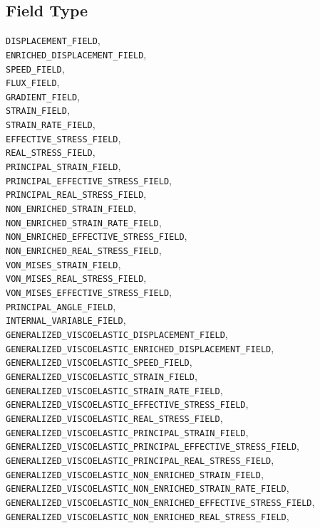 \documentclass[10pt]{article}
\begin{document}
\subsection{Field Type}

    \verb+DISPLACEMENT_FIELD+,\\
    \verb+ENRICHED_DISPLACEMENT_FIELD+,\\
    \verb+SPEED_FIELD+,\\
    \verb+FLUX_FIELD+,\\
    \verb+GRADIENT_FIELD+,\\
    \verb+STRAIN_FIELD+,\\
    \verb+STRAIN_RATE_FIELD+,\\
    \verb+EFFECTIVE_STRESS_FIELD+,\\
    \verb+REAL_STRESS_FIELD+,\\
    \verb+PRINCIPAL_STRAIN_FIELD+,\\
    \verb+PRINCIPAL_EFFECTIVE_STRESS_FIELD+,\\
    \verb+PRINCIPAL_REAL_STRESS_FIELD+,\\
    \verb+NON_ENRICHED_STRAIN_FIELD+,\\
    \verb+NON_ENRICHED_STRAIN_RATE_FIELD+,\\
    \verb+NON_ENRICHED_EFFECTIVE_STRESS_FIELD+,\\
    \verb+NON_ENRICHED_REAL_STRESS_FIELD+,\\
    \verb+VON_MISES_STRAIN_FIELD+,\\
    \verb+VON_MISES_REAL_STRESS_FIELD+,\\
    \verb+VON_MISES_EFFECTIVE_STRESS_FIELD+,\\
    \verb+PRINCIPAL_ANGLE_FIELD+,\\
    \verb+INTERNAL_VARIABLE_FIELD+,\\
    \verb+GENERALIZED_VISCOELASTIC_DISPLACEMENT_FIELD+,\\
    \verb+GENERALIZED_VISCOELASTIC_ENRICHED_DISPLACEMENT_FIELD+,\\
    \verb+GENERALIZED_VISCOELASTIC_SPEED_FIELD+,\\
    \verb+GENERALIZED_VISCOELASTIC_STRAIN_FIELD+,\\
    \verb+GENERALIZED_VISCOELASTIC_STRAIN_RATE_FIELD+,\\
    \verb+GENERALIZED_VISCOELASTIC_EFFECTIVE_STRESS_FIELD+,\\
    \verb+GENERALIZED_VISCOELASTIC_REAL_STRESS_FIELD+,\\
    \verb+GENERALIZED_VISCOELASTIC_PRINCIPAL_STRAIN_FIELD+,\\
    \verb+GENERALIZED_VISCOELASTIC_PRINCIPAL_EFFECTIVE_STRESS_FIELD+,\\
    \verb+GENERALIZED_VISCOELASTIC_PRINCIPAL_REAL_STRESS_FIELD+,\\
    \verb+GENERALIZED_VISCOELASTIC_NON_ENRICHED_STRAIN_FIELD+,\\
    \verb+GENERALIZED_VISCOELASTIC_NON_ENRICHED_STRAIN_RATE_FIELD+,\\
    \verb+GENERALIZED_VISCOELASTIC_NON_ENRICHED_EFFECTIVE_STRESS_FIELD+,\\
    \verb+GENERALIZED_VISCOELASTIC_NON_ENRICHED_REAL_STRESS_FIELD+,
\end{document}
